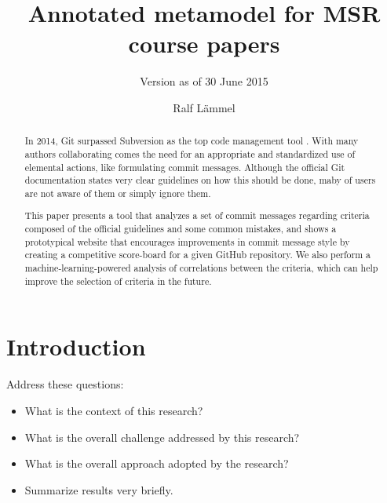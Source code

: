 \documentclass{llncs}
\begin{document}
\title{Annotated metamodel for MSR course papers}

\subtitle{Version as of 30 June 2015}

\author{Ralf L\"ammel}


\maketitle

\begin{abstract}
  In 2014, Git surpassed Subversion as the top code management tool
  \cite{EComSurv14}. With many authors collaborating comes the need for an
  appropriate and standardized use of elemental actions, like formulating
  commit messages. Although the official Git documentation states very clear
  guidelines \cite{OffGuide} on how this should be done, maby of users are not
  aware of them or simply ignore them.

  This paper presents a tool that analyzes a set of commit messages regarding
  criteria composed of the official guidelines and some common mistakes, and
  shows a prototypical website that encourages improvements in commit message
  style by creating a competitive score-board for a given GitHub repository. We
  also perform a machine-learning-powered analysis of correlations between the
  criteria, which can help improve the selection of criteria in the future.
\end{abstract}


\section{Introduction}

Address these questions:

\begin{itemize}

\item What is the context of this research?

\item What is the overall challenge addressed by this research?

\item What is the overall approach adopted by the research?

\item Summarize results very briefly.

\end{itemize}
\end{document}
